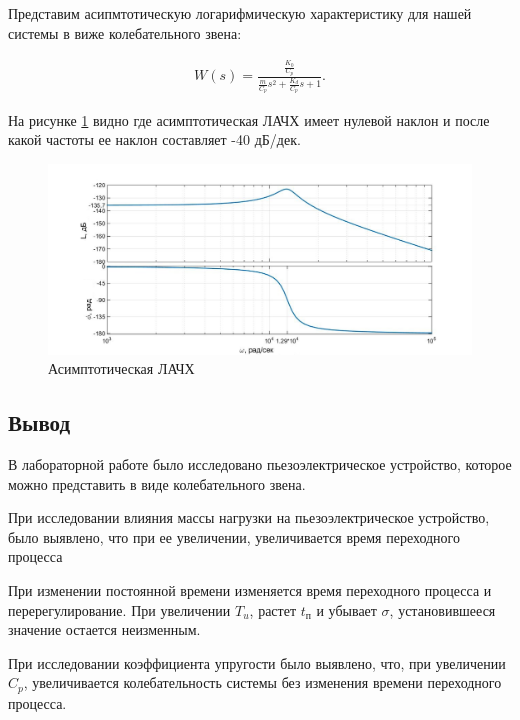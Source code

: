 \documentclass[a4paper, 12pt]{article}
\begin{document}
Представим асипмтотическую логарифмическую характеристику для нашей системы в виже колебательного звена:

\begin{align}
	W(s) = \frac{\displaystyle{\frac{K_0}{C_p}}}{\displaystyle{\frac{m}{C_p}}s^2 + \frac{K_d}{C_p}s + 1}.
\end{align}

На рисунке \ref{lachx} видно где асимптотическая ЛАЧХ имеет нулевой наклон и после какой частоты ее наклон составляет -40 дБ/дек.

\begin{figure}[h!]
	\centering
	\includegraphics[width = 0.65\textheight]{data/lachx}
	\caption{Асимптотическая ЛАЧХ}
	\label{lachx}
\end{figure}

\newpage

\begin{center}
	\section*{Вывод}
\end{center}\par
В лабораторной работе было исследовано пьезоэлектрическое устройство, которое можно представить в виде колебательного звена.\par
При исследовании влияния массы нагрузки на пьезоэлектрическое устройство, было выявлено, что при ее увеличении, увеличивается время переходного процесса\par
При изменении постоянной времени изменяется время переходного процесса и перерегулирование. При увеличении $T_u$, растет $t_\text{п}$ и убывает $\sigma$, установившееся значение остается неизменным.\par
При исследовании коэффициента упругости было выявлено, что, при увеличении $C_p$, увеличивается колебательность системы без изменения времени переходного процесса.
\end{document}
